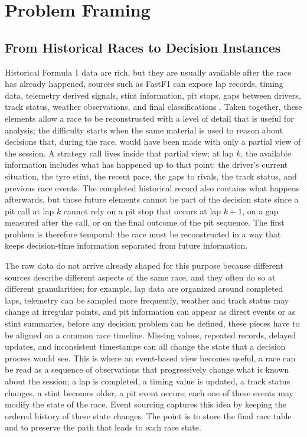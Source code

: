 \chapter{Problem Framing}
\label{ch:problem_framing}

\section{From Historical Races to Decision Instances}

Historical Formula 1 data are rich, but they are usually available after the race has already happened,
sources such as FastF1 can expose lap records, timing data, telemetry derived signals, stint information, pit stops,
gaps between drivers, track status, weather observations, and final classifications \citep{fastf1docs}.
Taken together, these elements allow a race to be reconstructed with a level of detail that is useful for analysis; 
the difficulty starts when the same material is used to reason about decisions that, during the race, would have been made with only a partial view of the session.
A strategy call lives inside that partial view;
at lap $k$, the available information includes what has happened up to that point: the driver's current situation, the tyre stint, the recent pace, the gaps to rivals,
the track status, and previous race events.
The completed historical record also contains what happens afterwards, but those future elements cannot be part of the decision state since
a pit call at lap $k$ cannot rely on a pit stop that occurs at lap $k+1$, on a gap measured after the call, or on the final outcome of the pit sequence.
The first problem is therefore temporal: the race must be reconstructed in a way that keeps decision-time information separated from future information.
\citep{akidau2015dataflow,brookshire2024leakage}

The raw data do not arrive already shaped for this purpose because different sources describe different aspects of the same race, and they often do so at different granularities;
for example, lap data are organized around completed laps, telemetry can be sampled more frequently, weather and track status may change at irregular points, 
and pit information can appear as direct events or as stint summaries,
before any decision problem can be defined, these pieces have to be aligned on a common race timeline.
Missing values, repeated records, delayed updates, and inconsistent timestamps can all change the state that a decision process would see.
This is where an event-based view becomes useful,
a race can be read as a sequence of observations that progressively change what is known about the session;
a lap is completed, a timing value is updated, a track status changes, a stint becomes older, a pit event occurs; each one of these events may modify the state of the race.
Event sourcing captures this idea by keeping the ordered history of these state changes.
\citep{fowler2005eventsourcing,kreps2011kafka}
The point is to store the final race table and to preserve the path that leads to each race state.

